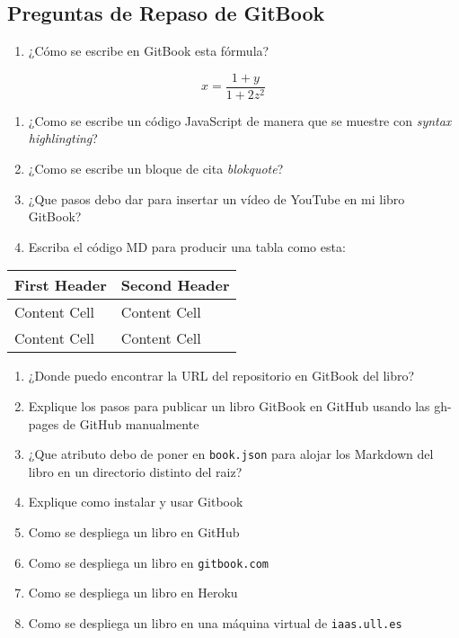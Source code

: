 \subsection{Preguntas de Repaso de
GitBook}\label{preguntas-de-repaso-de-gitbook}

\begin{enumerate}
\def\labelenumi{\arabic{enumi}.}
\itemsep1pt\parskip0pt
\item
  ¿Cómo se escribe en GitBook esta fórmula?
\end{enumerate}

\[x=\frac{1+y}{1+2z^2}\]

\begin{enumerate}
\def\labelenumi{\arabic{enumi}.}
\itemsep1pt\parskip0pt
\item
  ¿Como se escribe un código JavaScript de manera que se muestre con
  \emph{syntax highlingting}?
\item
  ¿Como se escribe un bloque de cita \emph{blokquote}?
\item
  ¿Que pasos debo dar para insertar un vídeo de YouTube en mi libro
  GitBook?
\item
  Escriba el código MD para producir una tabla como esta:
\end{enumerate}

\begin{longtable}[c]{@{}ll@{}}
\toprule
First Header & Second Header\tabularnewline
\midrule
\endhead
Content Cell & Content Cell\tabularnewline
Content Cell & Content Cell\tabularnewline
\bottomrule
\end{longtable}

\begin{enumerate}
\def\labelenumi{\arabic{enumi}.}
\itemsep1pt\parskip0pt
\item
  ¿Donde puedo encontrar la URL del repositorio en GitBook del libro?
\item
  Explique los pasos para publicar un libro GitBook en GitHub usando las
  gh-pages de GitHub manualmente
\item
  ¿Que atributo debo de poner en \texttt{book.json} para alojar los
  Markdown del libro en un directorio distinto del raiz?
\item
  Explique como instalar y usar Gitbook
\item
  Como se despliega un libro en GitHub
\item
  Como se despliega un libro en \texttt{gitbook.com}
\item
  Como se despliega un libro en Heroku
\item
  Como se despliega un libro en una máquina virtual de
  \texttt{iaas.ull.es}
\end{enumerate}
